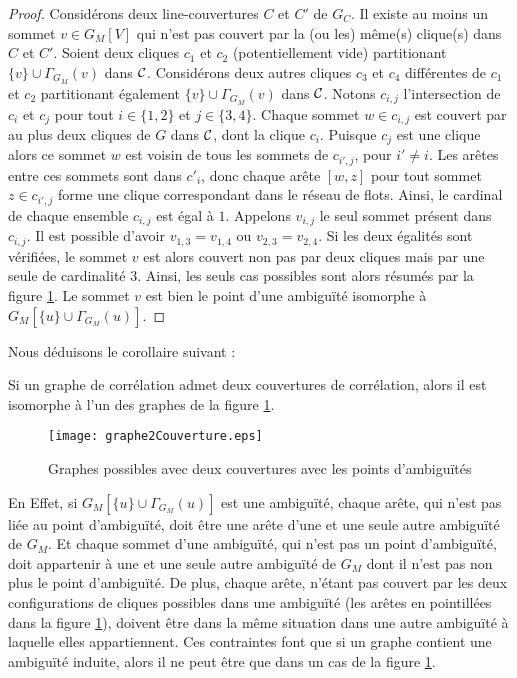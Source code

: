 \begin{proof} 
	Consid\'erons deux line-couvertures $C$ et $C'$ de $G_C$. 
	Il existe au moins un sommet $v \in G_M[V]$ qui n'est pas couvert par la (ou les) m\^eme(s) clique(s) dans $C$ et $C'$.
	Soient deux cliques $c_1$ et $c_2$ (potentiellement vide) partitionant $\{v\} \cup \Gamma_{G_M}(v)$ dans $\cal C$.
	Consid\'erons deux autres cliques $c_3$ et $c_4$ diff\'erentes de $c_1$ et $c_2$ partitionant \'egalement $\{v\} \cup \Gamma_{G_M}(v)$ dans $\cal C$. \newline
	Notons $c_{i,j}$ l'intersection de $c_{i}$ et $c_j$ pour tout $i \in \{1,2\}$ et $j \in \{3,4\}$. 
	Chaque sommet $w \in c_{i,j}$ est couvert par au plus deux cliques de $G$ dans $\cal C$, dont la clique $c_i$.
	Puisque $c_j$ est une clique alors ce sommet $w$ est voisin de tous les sommets de  $c_{i',j}$, pour $i' \ne i$.
	Les ar\^etes entre ces sommets sont dans $c'_i$, donc chaque ar\^ete $[w,z]$ pour tout sommet  $z \in c_{i',j}$ forme une clique correspondant dans le r\'eseau de flots.
	Ainsi, le cardinal de chaque ensemble  $c_{i,j}$ est \'egal \`a $1$.\newline
	Appelons $v_{i,j}$ le seul sommet pr\'esent dans $c_{i,j}$. 
	Il est possible d'avoir $v_{1,3} = v_{1,4}$ ou $v_{2,3} = v_{2,4}$.
	Si les deux \'egalit\'es sont v\'erifi\'ees, le sommet $v$ est alors couvert non pas par deux cliques mais par une seule de cardinalit\'e $3$.
	Ainsi, les seuls cas possibles sont alors r\'esum\'es par la figure  \ref{graphe2Couverture}.
	Le sommet $v$ est bien le point d'une ambigu\"{i}t\'e isomorphe \`a $G_M[\{u\} \cup \Gamma_{G_M}(u)]$.
\end{proof}

Nous d\'eduisons le corollaire suivant :
\begin{corollary}
Si un graphe de corr\'elation admet deux couvertures de corr\'elation, alors il est isomorphe \`a l'un des graphes de la figure  \ref{graphe2Couverture}.
\end{corollary}

\begin{figure}[htb!] \vspace{-0.5em}
\centering
\texttt{[image: graphe2Couverture.eps]}
\caption{ Graphes possibles avec deux couvertures avec les points d'ambigu\"{i}t\'es }
\label{graphe2Couverture} 
\end{figure}
En Effet, si $G_M[\{u\} \cup \Gamma_{G_M}(u)]$ est une ambigu\"{i}t\'e, chaque ar\^ete, qui n'est pas li\'ee au point d'ambigu\"{i}t\'e, doit \^etre une ar\^ete d'une et une seule autre ambigu\"{i}t\'e de $G_M$. Et chaque sommet d'une ambigu\"{i}t\'e, qui n'est pas un point d'ambigu\"{i}t\'e, doit appartenir \`a une et une seule autre ambigu\"{i}t\'e de $G_M$ dont il n'est pas non  plus le point d'ambigu\"{i}t\'e.
De plus, chaque ar\^ete, n'\'etant pas couvert par les deux configurations de cliques possibles dans une ambigu\"{i}t\'e (les ar\^etes en pointill\'ees dans la figure \ref{graphe2Couverture}), doivent \^etre dans la m\^eme situation dans une autre ambigu\"{i}t\'e \`a laquelle elles appartiennent.
Ces contraintes font que si un graphe contient une ambigu\"{i}t\'e induite, alors il ne peut \^etre que dans un cas de la figure  \ref{graphe2Couverture}.

